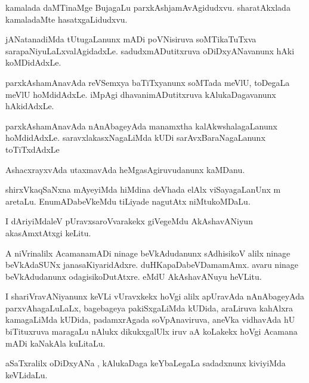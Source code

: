 \documentclass{article}
\begin{document}
\begin{mn}%
kamalada daMTinaMge BujagaLu parxkAshjamAvAgidudxvu. sharatAkxlada kamaladaMte 
hasatxgaLidudxvu.
\end{mn}

\begin{mn}%
jANatanadiMda tUtugaLanunx mADi poVNisiruva soMTikaTuTxva sarapaNiyuLaLxvalAgidadxLe. 
sadudxmADutitxruva oDiDxyANavanunx hAki koMDidAdxLe.
\end{mn}

\begin{mn}%
parxkAshamAnavAda reVSemxya baTiTxyanunx soMTada meVlU, toDegaLa meVlU hoMdidAdxLe. iMpAgi 
dhavanimADutitxruva kAlukaDagavanunx hAkidAdxLe.
\end{mn}

\begin{mn}%
parxkAshamAnavAda nAnAbageyAda manamxtha kalAkwshalagaLanunx hoMdidAdxLe. 
saravxlakasxNagaLiMda kUDi sarAvxBaraNagaLanunx toTiTxdAdxLe
\end{mn}

\begin{mn}%
AshacxrayxvAda utaxmavAda heMgasAgiruvudanunx kaMDanu.
\end{mn}

\begin{mn}%
shirxVkaqSaNxna mAyeyiMda hiMdina deVhada elAlx viSayagaLanUnx m aretaLu. EnumADabeVkeMdu 
tiLiyade nagutAtx niMtukoMDaLu.
\end{mn}

\begin{mn}%
I dAriyiMdaleV pUravxsaroVvarakekx giVegeMdu AkAshavANiyun akasAmxtAtxgi keLitu.
\end{mn}

\begin{mn}%
A niVrinalilx AcamanamADi ninage beVkAdudanunx sAdhisikoV alilx ninage beVkAdaSUNx 
janasaKiyaridAdxre. duHKapaDabeVDamamAmx. avaru ninage beVkAdudanunx odagisikoDutAtxre. 
eMdU AkAshavANuyu heVLitu.
\end{mn}

\begin{mn}%
I shariVravANiyanunx keVLi vUravxkekx hoVgi alilx apUravAda nAnAbageyAda parxvAhagaLuLaLx, 
bagebageya pakiSxgaLiMda kUDida, araLiruva kahAlxra kamagaLiMda kUDida, padamxrAgada 
soVpAnaviruva, aneVka vidhavAda hU biTituxruva maragaLu nAlukx dikukxgalUlx iruv aA 
koLakekx hoVgi Acamana mADi kaNakAla kuLitaLu.
\end{mn}

\begin{mn}%
aSaTxralilx oDiDxyANa , kAlukaDaga keYbaLegaLa sadadxnunx kiviyiMda keVLidaLu.
\end{mn}
\end{document}
